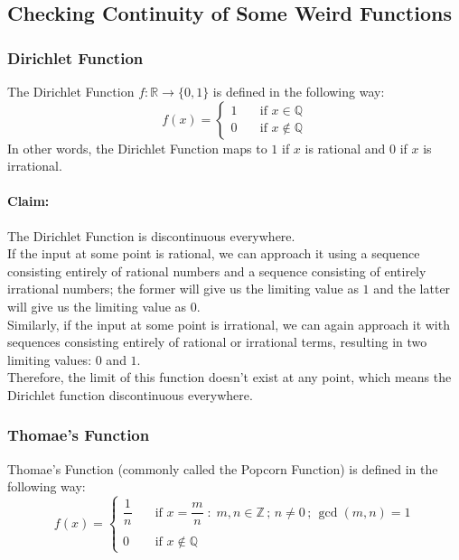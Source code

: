 \documentclass[14]{article}
\theoremstyle{definition}
\begin{document}
\subsection{Checking Continuity of Some Weird Functions}
\subsubsection{Dirichlet Function}
The Dirichlet Function $f:\mathbb{R}\to \{0, 1\}$ is defined in the following way:
\[
f\left(x\right) = \left\{
        \begin{array}{ll}
            1 & \quad \text{if } x \in \mathbb{Q} \\
            0 & \quad \text{if } x \notin \mathbb{Q}
        \end{array}
    \right.
\]
In other words, the Dirichlet Function maps to $1$ if $x$ is rational and $0$ if $x$ is irrational.\\
\paragraph{Claim:} The Dirichlet Function is discontinuous everywhere.\\
If the input at some point is rational, we can approach it using a sequence consisting entirely of rational numbers and a sequence consisting of entirely irrational numbers; the former will give us the limiting value as $1$ and the latter will give us the limiting value as $0$.\\
Similarly, if the input at some point is irrational, we can again approach it with sequences consisting entirely of rational or irrational terms, resulting in two limiting values: $0$ and $1$.\\
Therefore, the limit of this function doesn't exist at any point, which means the Dirichlet function discontinuous everywhere.
\subsubsection{Thomae's Function}
Thomae's Function (commonly called the Popcorn Function) is defined in the following way:\\
\[
f\left(x\right) = \left\{
        \begin{array}{ll}
            \dfrac{1}{n} & \quad \text{if } x = \dfrac{m}{n}\; : \; m, n \in \mathbb{Z}\,;\, n \neq 0\,;\, \gcd (m, n) = 1  \\\\
            0 & \quad \text{if } x \notin \mathbb{Q}
        \end{array}
    \right.
\]
\end{document}
